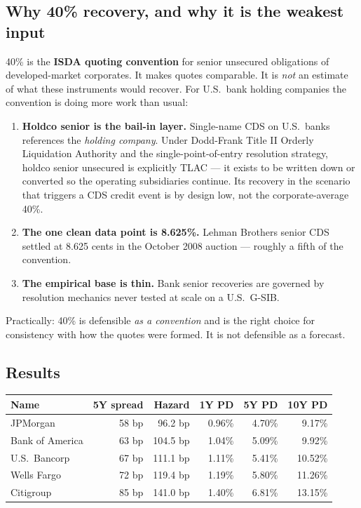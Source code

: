 \documentclass[11pt,a4paper]{article}
\begin{document}
\subsection{Why 40\% recovery, and why it is the weakest input}

40\% is the \textbf{ISDA quoting convention} for senior unsecured obligations of
developed-market corporates. It makes quotes comparable. It is \emph{not} an estimate of what
these instruments would recover. For U.S.\ bank holding companies the convention is doing more
work than usual:

\begin{enumerate}[leftmargin=1.4em,itemsep=0.25em]
\item \textbf{Holdco senior is the bail-in layer.} Single-name CDS on U.S.\ banks references
the \emph{holding company}. Under Dodd-Frank Title II Orderly Liquidation Authority and the
single-point-of-entry resolution strategy, holdco senior unsecured is explicitly TLAC --- it
exists to be written down or converted so the operating subsidiaries continue. Its recovery in
the scenario that triggers a CDS credit event is by design low, not the corporate-average 40\%.
\item \textbf{The one clean data point is 8.625\%.} Lehman Brothers senior CDS settled at
8.625 cents in the October 2008 auction --- roughly a fifth of the convention.
\item \textbf{The empirical base is thin.} Bank senior recoveries are governed by resolution
mechanics never tested at scale on a U.S.\ G-SIB.
\end{enumerate}

Practically: 40\% is defensible \emph{as a convention} and is the right choice for consistency
with how the quotes were formed. It is not defensible as a forecast.

\subsection{Results}

\begin{center}
\begin{tabular}{lrrrrr}
\toprule
\textbf{Name} & \textbf{5Y spread} & \textbf{Hazard} & \textbf{1Y PD} & \textbf{5Y PD} & \textbf{10Y PD} \\
\midrule
JPMorgan        & 58 bp & 96.2 bp  & 0.96\% & 4.70\% & 9.17\% \\
Bank of America & 63 bp & 104.5 bp & 1.04\% & 5.09\% & 9.92\% \\
U.S.\ Bancorp   & 67 bp & 111.1 bp & 1.11\% & 5.41\% & 10.52\% \\
Wells Fargo     & 72 bp & 119.4 bp & 1.19\% & 5.80\% & 11.26\% \\
Citigroup       & 85 bp & 141.0 bp & 1.40\% & 6.81\% & 13.15\% \\
\bottomrule
\end{tabular}
\end{center}
\end{document}
